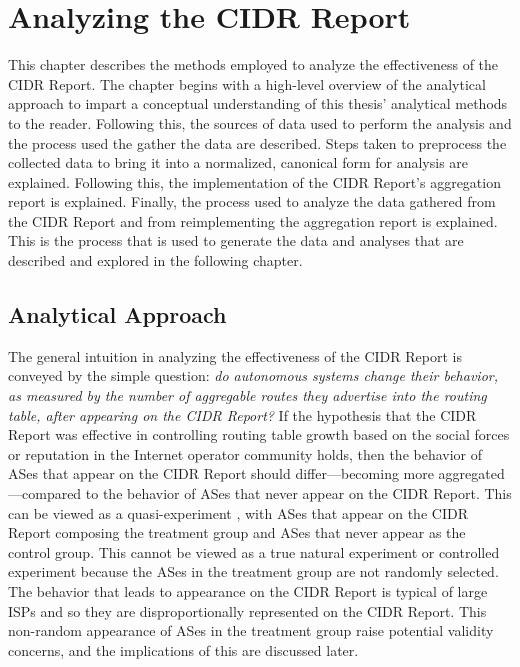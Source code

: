 \chapter{Analyzing the CIDR Report} %
\label{chap:method}

This chapter describes the methods employed to analyze the effectiveness of the
CIDR Report. The chapter begins with a high-level overview of the analytical
approach to impart a conceptual understanding of this thesis' analytical
methods to the reader. Following this, the sources of data used to perform the
analysis and the process used the gather the data are described. Steps taken to
preprocess the collected data to bring it into a normalized, canonical form for
analysis are explained. Following this, the implementation of the CIDR Report's
aggregation report is explained. Finally, the process used to analyze the data
gathered from the CIDR Report and from reimplementing the aggregation report is
explained. This is the process that is used to generate the data and analyses
that are described and explored in the following chapter.

\section{Analytical Approach}


The general intuition in analyzing the effectiveness of the CIDR Report is
conveyed by the simple question: \emph{do autonomous systems change their
behavior, as measured by the number of aggregable routes they advertise into
the routing table, after appearing on the CIDR Report?} If the hypothesis that
the CIDR Report was effective in controlling routing table growth based on the
social forces or reputation in the Internet operator community holds, then the
behavior of ASes that appear on the CIDR Report should differ---becoming more
aggregated---compared to the behavior of ASes that never appear on the CIDR
Report. This can be viewed as a quasi-experiment \cite{Babbie:2003uq}, with
ASes that appear on the CIDR Report composing the treatment group and ASes that
never appear as the control group. This cannot be viewed as a true natural
experiment or controlled experiment because the ASes in the treatment group are
not randomly selected. The behavior that leads to appearance on the CIDR Report
is typical of large ISPs and so they are disproportionally represented on the
CIDR Report. This non-random appearance of ASes in the treatment group raise
potential validity concerns, and the implications of this are discussed later.

